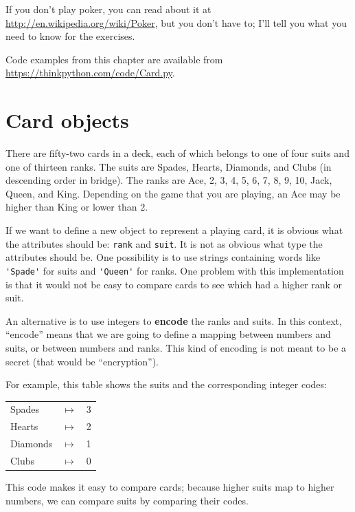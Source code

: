 \documentclass[10pt]{book}
\begin{document}
If you don't play
poker, you can read about it at
\url{http://en.wikipedia.org/wiki/Poker}, but you don't have to; I'll
tell you what you need to know for the exercises.

Code examples from
this chapter are available from
\url{https://thinkpython.com/code/Card.py}.


\section{Card objects}

There are fifty-two cards in a deck, each of which belongs to one of
four suits and one of thirteen ranks.  The suits are Spades, Hearts,
Diamonds, and Clubs (in descending order in bridge).  The ranks are
Ace, 2, 3, 4, 5, 6, 7, 8, 9, 10, Jack, Queen, and King.  Depending on
the game that you are playing, an Ace may be higher than King
or lower than 2.

If we want to define a new object to represent a playing card, it is
obvious what the attributes should be: {\tt rank} and
{\tt suit}.  It is not as obvious what type the attributes
should be.  One possibility is to use strings containing words like
\verb"'Spade'" for suits and \verb"'Queen'" for ranks.  One problem with
this implementation is that it would not be easy to compare cards to
see which had a higher rank or suit.

An alternative is to use integers to {\bf encode} the ranks and suits.
In this context, ``encode'' means that we are going to define a mapping
between numbers and suits, or between numbers and ranks.  This
kind of encoding is not meant to be a secret (that
would be ``encryption'').

\newcommand{\mymapsto}{$\mapsto$}

For example, this table shows the suits and the corresponding integer
codes:

\begin{tabular}{l c l}
Spades & \mymapsto & 3 \\
Hearts & \mymapsto & 2 \\
Diamonds & \mymapsto & 1 \\
Clubs & \mymapsto & 0
\end{tabular}

This code makes it easy to compare cards; because higher suits map to
higher numbers, we can compare suits by comparing their codes.
\end{document}
